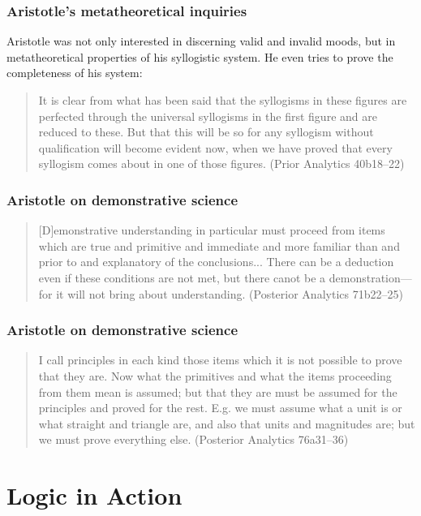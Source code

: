 \documentclass[compress,12pt]{beamer}
\begin{document}
\begin{frame}
    \frametitle{Aristotle's metatheoretical inquiries}
    Aristotle was not only interested in discerning valid and invalid moods, but in metatheoretical properties of his syllogistic system. He even tries to prove the completeness of his system:\vspace{0.3cm}
    \begin{quote}
        It is clear from what has been said that the syllogisms in these figures are perfected through the universal syllogisms in the first figure and are reduced to these. But that this will be so for any syllogism without qualification will become evident now, when we have proved that every syllogism comes about in one of those figures. (\textup{Prior Analytics} 40b18--22)
    \end{quote}
\end{frame}

\begin{frame}
    \frametitle{Aristotle on demonstrative science}
    \begin{quote}
        [D]emonstrative understanding in particular must proceed from items which are true and primitive and immediate and more familiar than and prior to and explanatory of the conclusions... There can be a deduction even if these conditions are not met, but there canot be a demonstration---for it will not bring about understanding. (\textup{Posterior Analytics} 71b22--25)
    \end{quote}


\end{frame}

\begin{frame}
    \frametitle{Aristotle on demonstrative science}
    \begin{quote}
        I call principles in each kind those items which it is not possible to prove that they are. Now what the primitives and what the items proceeding from them mean is assumed; but that they are must be assumed for the principles and proved for the rest. E.g. we must assume what a unit is or what straight and triangle are, and also that units and magnitudes are; but we must prove everything else. (\textup{Posterior Analytics} 76a31--36)
    \end{quote}
\end{frame}

\section{Logic in Action}
\end{document}
